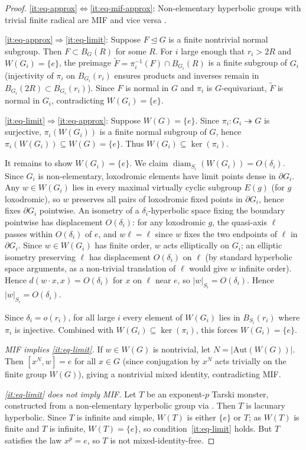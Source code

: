 \documentclass[12pt]{amsart}
\theoremstyle{plain}
\theoremstyle{definition}
\DeclareMathOperator{\diam}{diam}
\begin{document}
\begin{proof}
\ref{it:eq-approx}$\Leftrightarrow$\ref{it:eq-mif-approx}: Non-elementary hyperbolic groups with trivial finite radical are MIF and vice versa \cite[Corollary~1.7]{HullOsin}.

\ref{it:eq-approx}$\Rightarrow$\ref{it:eq-limit}: Suppose $F \trianglelefteq G$ is a finite nontrivial normal subgroup.
Then $F \subset B_G(R)$ for some $R$. For $i$ large enough that $r_i > 2R$ and $W(G_i)=\{e\}$,
the preimage $\tilde{F} = \pi_i^{-1}(F) \cap B_{G_i}(R)$ is a finite subgroup of $G_i$
(injectivity of $\pi_i$ on $B_{G_i}(r_i)$ ensures products and inverses remain in $B_{G_i}(2R) \subset B_{G_i}(r_i)$).
Since $F$ is normal in $G$ and $\pi_i$ is $G$-equivariant, $\tilde{F}$ is normal in $G_i$,
contradicting $W(G_i) = \{e\}$.

\ref{it:eq-limit}$\Rightarrow$\ref{it:eq-approx}: Suppose $W(G) = \{e\}$.
Since $\pi_i \colon G_i \twoheadrightarrow G$ is surjective, $\pi_i(W(G_i))$ is a finite normal subgroup of $G$,
hence $\pi_i(W(G_i)) \subseteq W(G) = \{e\}$.
Thus $W(G_i) \subseteq \ker(\pi_i)$.

It remains to show $W(G_i) = \{e\}$.
We claim $\diam_{S_i}(W(G_i)) = O(\delta_i)$.
Since $G_i$ is non-elementary, loxodromic elements have limit points dense in $\partial G_i$.
Any $w \in W(G_i)$ lies in every maximal virtually cyclic subgroup $E(g)$ (for $g$ loxodromic),
so $w$ preserves all pairs of loxodromic fixed points in $\partial G_i$, hence fixes $\partial G_i$
pointwise.
An isometry of a $\delta_i$-hyperbolic space fixing the boundary pointwise has displacement $O(\delta_i)$:
for any loxodromic $g$, the quasi-axis $\ell$ passes within $O(\delta_i)$ of $e$, and $w\ell = \ell$
since $w$ fixes the two endpoints of $\ell$ in $\partial G_i$.
Since $w \in W(G_i)$ has finite order, $w$ acts elliptically on $G_i$; an elliptic isometry
preserving $\ell$ has displacement $O(\delta_i)$ on $\ell$ (by standard hyperbolic space arguments,
as a non-trivial translation of $\ell$ would give $w$ infinite order).
Hence $d(w\cdot x, x) = O(\delta_i)$ for $x$ on $\ell$ near $e$, so $|w|_{S_i} = O(\delta_i)$.
Hence $|w|_{S_i} = O(\delta_i)$.

Since $\delta_i = o(r_i)$, for all large $i$ every element of $W(G_i)$ lies in $B_{S_i}(r_i)$
where $\pi_i$ is injective. Combined with $W(G_i) \subseteq \ker(\pi_i)$, this forces $W(G_i) = \{e\}$.

\textit{MIF implies \ref{it:eq-limit}.}
If $w \in W(G)$ is nontrivial, let $N = |\mathrm{Aut}(W(G))|$.
Then $[x^N, w] = e$ for all $x \in G$ (since conjugation by $x^N$ acts trivially on the finite group $W(G)$),
giving a nontrivial mixed identity, contradicting MIF.

\textit{\ref{it:eq-limit} does not imply MIF.}
Let $T$ be an exponent-$p$ Tarski monster, constructed from a non-elementary hyperbolic group via \cite[Theorem~4.26(2), Remark~4.27]{OOS}.
Then $T$ is lacunary hyperbolic.
Since $T$ is infinite and simple, $W(T)$ is either $\{e\}$ or $T$; as $W(T)$ is finite and $T$ is infinite, $W(T) = \{e\}$, so condition~\ref{it:eq-limit} holds.
But $T$ satisfies the law $x^p = e$, so $T$ is not mixed-identity-free.
\end{proof}
\end{document}
